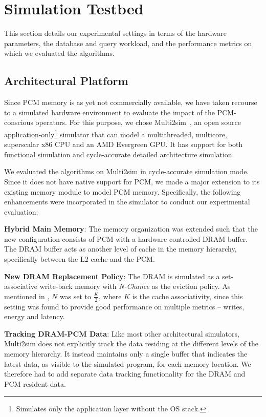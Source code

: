 \label{sec:exp}

\section{Simulation Testbed}
This section details our experimental settings in terms of the hardware
parameters, the database and query workload, and the performance metrics
on which we evaluated the algorithms.



\subsection{Architectural Platform}
Since PCM memory is as yet not commercially available, we
have taken recourse to a simulated hardware environment to
evaluate the impact of the PCM-conscious operators.  For this
purpose, we chose Multi2sim~\cite{multi2sim}, an open source
application-only\footnote{Simulates only the application layer without
the OS stack.} simulator that can model a multithreaded, multicore,
superscalar x86 CPU and an AMD Evergreen GPU. It has support for both
functional simulation and cycle-accurate detailed architecture simulation.

We evaluated the algorithms on Multi2sim in cycle-accurate simulation
mode. Since it does not have native support for PCM, we made a major
extension to its existing memory module to model PCM memory. Specifically,
the following enhancements were incorporated in the simulator to conduct
our experimental evaluation:

\textbf{Hybrid Main Memory}: 
The memory organization was extended such that the new configuration
consists of PCM with a hardware controlled DRAM buffer. The DRAM buffer
acts as another level of cache in the memory hierarchy, specifically
between the L2 cache and the PCM.

\textbf{New DRAM Replacement Policy}: 
The DRAM is simulated as a set-associative write-back memory with
\textit{N-Chance} as the eviction policy. As mentioned in \cite{nchance},
$N$ was set to $\frac{K}{2}$, where $K$ is the cache associativity,
since this setting was found to provide good performance on multiple
metrics -- writes, energy and latency.

\textbf{Tracking DRAM-PCM Data}:
Like most other architectural simulators, Multi2sim does not explicitly
track the data residing at the different levels of the memory
hierarchy. It instead maintains only a single buffer that indicates
the latest data, as visible to the simulated program, for each memory
location. We therefore had to add separate data tracking functionality
for the DRAM and PCM resident data.

